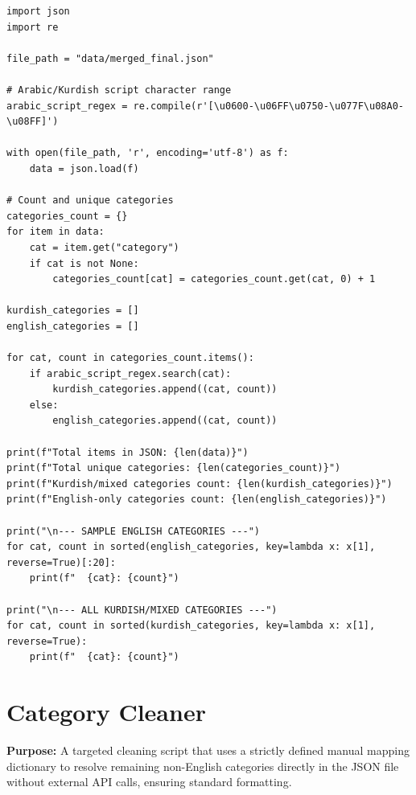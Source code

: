 \documentclass[11pt]{article}
\begin{document}
\begin{lstlisting}[style=pythoncode, caption={analyze\_categories.py}]
import json
import re

file_path = "data/merged_final.json"

# Arabic/Kurdish script character range
arabic_script_regex = re.compile(r'[\u0600-\u06FF\u0750-\u077F\u08A0-\u08FF]')

with open(file_path, 'r', encoding='utf-8') as f:
    data = json.load(f)

# Count and unique categories
categories_count = {}
for item in data:
    cat = item.get("category")
    if cat is not None:
        categories_count[cat] = categories_count.get(cat, 0) + 1

kurdish_categories = []
english_categories = []

for cat, count in categories_count.items():
    if arabic_script_regex.search(cat):
        kurdish_categories.append((cat, count))
    else:
        english_categories.append((cat, count))

print(f"Total items in JSON: {len(data)}")
print(f"Total unique categories: {len(categories_count)}")
print(f"Kurdish/mixed categories count: {len(kurdish_categories)}")
print(f"English-only categories count: {len(english_categories)}")

print("\n--- SAMPLE ENGLISH CATEGORIES ---")
for cat, count in sorted(english_categories, key=lambda x: x[1], reverse=True)[:20]:
    print(f"  {cat}: {count}")

print("\n--- ALL KURDISH/MIXED CATEGORIES ---")
for cat, count in sorted(kurdish_categories, key=lambda x: x[1], reverse=True):
    print(f"  {cat}: {count}")
\end{lstlisting}


\section{Category Cleaner} \label{sec:catcleaner}
\textbf{Purpose:} A targeted cleaning script that uses a strictly defined manual mapping dictionary to resolve remaining non-English categories directly in the JSON file without external API calls, ensuring standard formatting.
\end{document}
